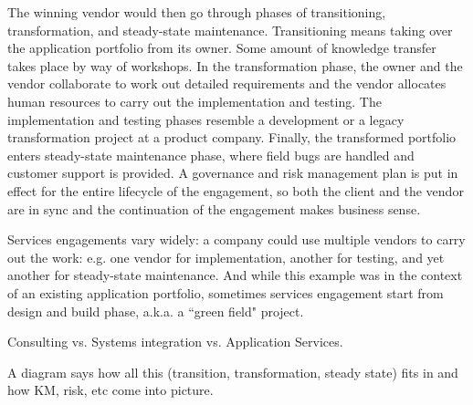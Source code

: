 The winning vendor would then go through phases of transitioning, transformation, and steady-state maintenance. Transitioning means taking over the application portfolio from its owner. Some amount of knowledge transfer takes place by way of workshops. In the transformation phase, the owner and the vendor collaborate to work out detailed requirements and the vendor allocates human resources to carry out the implementation and testing. The implementation and testing phases resemble a development or a legacy transformation project at a product company.  Finally, the transformed portfolio enters steady-state maintenance phase, where field bugs are handled and customer support is provided.  A governance and risk management plan is put in effect for the entire lifecycle of the engagement, so both the client and the vendor are in sync and the continuation of the engagement makes business sense.

Services engagements vary widely: a company could use multiple vendors to carry out the work: e.g. one vendor for implementation, another for testing, and yet another for steady-state maintenance.  And while this example was in the context of an existing application portfolio, sometimes services engagement start from design and build phase, a.k.a. a ``green field" project.

Consulting vs. Systems integration vs. Application Services.

%
%
%

A diagram says how all this (transition, transformation, steady state) fits in and how KM, risk, etc come into picture.

